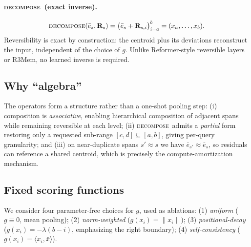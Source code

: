 \documentclass[11pt]{article}
\newcommand{\ebar}{\bar{e}}
\newcommand{\decompose}{\textsc{decompose}}
\newcommand{\R}{\mathbf{R}}
\begin{document}
\paragraph{\decompose\ (exact inverse).}
\begin{equation}
\decompose(\ebar_s, \R_s) = \big(\ebar_s + \R_{s,i}\big)_{i=a}^{b} = (x_a,\dots,x_b).
\end{equation}
Reversibility is exact by construction: the centroid plus its deviations reconstruct the
input, independent of the choice of $g$. Unlike Reformer-style reversible layers or R3Mem,
no learned inverse is required.

\subsection{Why ``algebra''}
The operators form a structure rather than a one-shot pooling step: (i) composition is
\emph{associative}, enabling hierarchical composition of adjacent spans while remaining
reversible at each level; (ii) \decompose\ admits a \emph{partial} form restoring only a
requested sub-range $[c,d]\subseteq[a,b]$, giving per-query granularity; and (iii) on
near-duplicate spans $s'\approx s$ we have $\ebar_{s'}\approx\ebar_s$, so residuals can
reference a shared centroid, which is precisely the compute-amortization mechanism.

\subsection{Fixed scoring functions}
\label{sec:scoring}
We consider four parameter-free choices for $g$, used as ablations:
(1) \emph{uniform} ($g\equiv 0$, mean pooling);
(2) \emph{norm-weighted} ($g(x_i)=\lVert x_i\rVert$);
(3) \emph{positional-decay} ($g(x_i)=-\lambda(b-i)$, emphasizing the right boundary);
(4) \emph{self-consistency} ($g(x_i)=\langle x_i,\bar{x}\rangle$).
\end{document}
